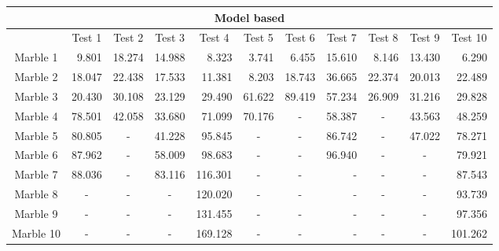 \documentclass[../Head/Main.tex]{subfiles}
\begin{document}
\begin{table}[H]
\centering
\begin{tabular}{|c|r|c|r|r|c|c|r|c|c|r|}
\hline
\multicolumn{11}{|c|}{\textbf{Model based}} \\ \hline
 & \multicolumn{1}{c|}{Test 1} & Test 2 & \multicolumn{1}{c|}{Test 3} & \multicolumn{1}{c|}{Test 4} & Test 5 & Test 6 & \multicolumn{1}{c|}{Test 7} & Test 8 & Test 9 & \multicolumn{1}{c|}{Test 10} \\ \hline
Marble 1 & 9.801 & \multicolumn{1}{r|}{18.274} & 14.988 & 8.323 & \multicolumn{1}{r|}{3.741} & \multicolumn{1}{r|}{6.455} & 15.610 & \multicolumn{1}{r|}{8.146} & \multicolumn{1}{r|}{13.430} & 6.290 \\ \hline
Marble 2 & 18.047 & \multicolumn{1}{r|}{22.438} & 17.533 & 11.381 & \multicolumn{1}{r|}{8.203} & \multicolumn{1}{r|}{18.743} & 36.665 & \multicolumn{1}{r|}{22.374} & \multicolumn{1}{r|}{20.013} & 22.489 \\ \hline
Marble 3 & 20.430 & \multicolumn{1}{r|}{30.108} & 23.129 & 29.490 & \multicolumn{1}{r|}{61.622} & \multicolumn{1}{r|}{89.419} & 57.234 & \multicolumn{1}{r|}{26.909} & \multicolumn{1}{r|}{31.216} & 29.828 \\ \hline
Marble 4 & 78.501 & \multicolumn{1}{r|}{42.058} & 33.680 & 71.099 & \multicolumn{1}{r|}{70.176} & - & 58.387 & - & \multicolumn{1}{r|}{43.563} & 48.259 \\ \hline
Marble 5 & 80.805 & - & 41.228 & 95.845 & - & - & 86.742 & - & \multicolumn{1}{r|}{47.022} & 78.271 \\ \hline
Marble 6 & 87.962 & - & 58.009 & 98.683 & - & - & 96.940 & - & - & 79.921 \\ \hline
Marble 7 & 88.036 & - & 83.116 & 116.301 & - & - & - & - & - & 87.543 \\ \hline
Marble 8 & \multicolumn{1}{c|}{-} & - & \multicolumn{1}{c|}{-} & 120.020 & - & - & - & - & - & 93.739 \\ \hline
Marble 9 & \multicolumn{1}{c|}{-} & - & \multicolumn{1}{c|}{-} & 131.455 & - & - & - & - & - & 97.356 \\ \hline
Marble 10 & \multicolumn{1}{c|}{-} & - & \multicolumn{1}{c|}{-} & 169.128 & - & - & - & - & - & 101.262 \\ \hline
\end{tabular}
\end{table}
\end{document}
